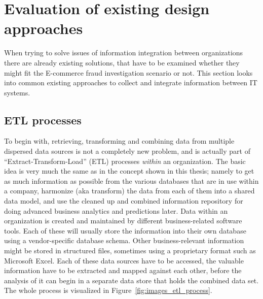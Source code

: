 
\section{Evaluation of existing design approaches}
\label{sec:system_approaches}

When trying to solve issues of information integration between organizations there are already existing solutions, that have to be examined whether they might fit the \gls{E-commerce} fraud investigation scenario or not. This section looks into common existing approaches to collect and integrate information between \gls{IT} systems.

\subsection{\gls{ETL} processes}
\label{subsec:etl_process}

To begin with, retrieving, transforming and combining data from multiple dispersed data sources is not a completely new problem, and is actually part of ``Extract-Transform-Load'' (\gls{ETL}) processes \emph{within} an organization. The basic idea is very much the same as in the concept shown in this thesis; namely to get as much information as possible from the various databases that are in use within a company, harmonize (aka transform) the data from each of them into a shared data model, and use the cleaned up and combined information repository for doing advanced business analytics and predictions later. Data within an organization is created and maintained by different business-related software tools. Each of these will usually store the information into their own database using a vendor-specific database schema. Other business-relevant information might be stored in structured files, sometimes using a proprietary format such as Microsoft Excel. Each of these data sources have to be accessed, the valuable information have to be extracted and mapped against each other, before the analysis of it can begin in a separate data store that holds the combined data set. The whole process is visualized in Figure~\ref{fig:images_etl_process}. \@


